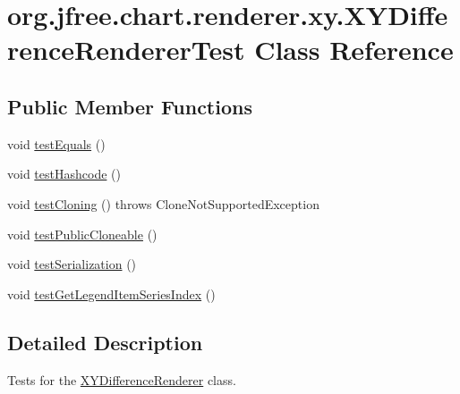 \hypertarget{classorg_1_1jfree_1_1chart_1_1renderer_1_1xy_1_1_x_y_difference_renderer_test}{}\section{org.\+jfree.\+chart.\+renderer.\+xy.\+X\+Y\+Difference\+Renderer\+Test Class Reference}
\label{classorg_1_1jfree_1_1chart_1_1renderer_1_1xy_1_1_x_y_difference_renderer_test}
\subsection*{Public Member Functions}
\begin{DoxyCompactItemize}
\item 
void \mbox{\hyperlink{classorg_1_1jfree_1_1chart_1_1renderer_1_1xy_1_1_x_y_difference_renderer_test_af23aa31f623a04832fcb63ce81e8b392}{test\+Equals}} ()
\item 
void \mbox{\hyperlink{classorg_1_1jfree_1_1chart_1_1renderer_1_1xy_1_1_x_y_difference_renderer_test_a469a82d77d865eaed95381cc0a405104}{test\+Hashcode}} ()
\item 
void \mbox{\hyperlink{classorg_1_1jfree_1_1chart_1_1renderer_1_1xy_1_1_x_y_difference_renderer_test_a99d8c91fcf8290a49992e4bd580763a3}{test\+Cloning}} ()  throws Clone\+Not\+Supported\+Exception 
\item 
void \mbox{\hyperlink{classorg_1_1jfree_1_1chart_1_1renderer_1_1xy_1_1_x_y_difference_renderer_test_a0c92ba0f57a37b0a50a6612d9b2cfc6d}{test\+Public\+Cloneable}} ()
\item 
void \mbox{\hyperlink{classorg_1_1jfree_1_1chart_1_1renderer_1_1xy_1_1_x_y_difference_renderer_test_abf21cd7ea99dca3a72463e611cf0b636}{test\+Serialization}} ()
\item 
void \mbox{\hyperlink{classorg_1_1jfree_1_1chart_1_1renderer_1_1xy_1_1_x_y_difference_renderer_test_a27399bbb5562adf48ded7a691f879ece}{test\+Get\+Legend\+Item\+Series\+Index}} ()
\end{DoxyCompactItemize}


\subsection{Detailed Description}
Tests for the \mbox{\hyperlink{classorg_1_1jfree_1_1chart_1_1renderer_1_1xy_1_1_x_y_difference_renderer}{X\+Y\+Difference\+Renderer}} class. 

